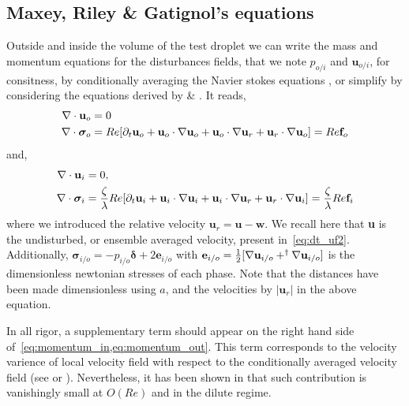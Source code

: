 \subsection{Maxey, Riley \& Gatignol's equations}

Outside and inside the volume of the test droplet we can write the mass and momentum equations for the disturbances fields, that we note $p_{o/i}$ and $\textbf{u}_{o/i}$, for consitness, by conditionally averaging the Navier stokes equations \citet{koch1993hydrodynamic,fintzi2025}, or simplify by considering the equations derived by \cite{maxey1983equation} \& \citet{gatignol1983faxen}. 
It reads, 
\begin{align}
    \div \textbf{u}_{o} &= 0
    \\
    \div\bm\sigma_{o}
    &= 
    Re [
    \pddt \textbf{u}_{o}
    + \textbf{u}_{o}\cdot \grad \textbf{u}_{o}
    + \textbf{u}_{o}\cdot \grad \textbf{u}_r
    + \textbf{u}_r \cdot \grad \textbf{u}_{o}]
    = Re \textbf{f}_{o}
    \label{eq:momentum_out}
\end{align}
and, 
\begin{align}
    \div \textbf{u}_{i} &= 0,
    \\
    \div\bm\sigma_{i}
    &= 
    \frac{\zeta}{\lambda}Re [
    \pddt \textbf{u}_{i}
    + \textbf{u}_{i}\cdot \grad \textbf{u}_{i}
    + \textbf{u}_{i}\cdot \grad \textbf{u}_r 
    + \textbf{u}_r \cdot \grad \textbf{u}_{i}]
    = \frac{\zeta}{\lambda}Re \textbf{f}_{i}
    \label{eq:momentum_in}
\end{align}
where we introduced the relative velocity $\textbf{u}_r = \textbf{u} - \textbf{w}$.  
We recall here that \textbf{u} is the undisturbed, or ensemble averaged velocity, present in~\ref{eq:dt_uf2}.
Additionally, $\bm\sigma_{i/o} = -p_{i/o}\bm\delta + 2\textbf{e}_{i/o}$ with $\textbf{e}_{i/o} = \frac{1}{2}[\mathbf{\nabla} \textbf{u}_{i/o} + ^{\dagger}\mathbf{\nabla} \textbf{u}_{i/o}]$ is the dimensionless newtonian stresses of each phase. 
Note that the distances have been made dimensionless using $a$, and the velocities by $|\textbf{u}_r|$ in the above equation. 

In all rigor, a supplementary term should appear on the right hand side of~\ref{eq:momentum_in,eq:momentum_out}.
This term corresponds to the velocity varience of local velocity field with respect to the conditionally averaged velocity field (see \citet[Chapter 4]{fintzi2025} or \citet{koch1993hydrodynamic}). 
Nevertheless, it has been shown in \citep[Appendix A]{koch1993hydrodynamic} that such contribution is vanishingly small at $O(Re)$ and in the dilute regime. 

